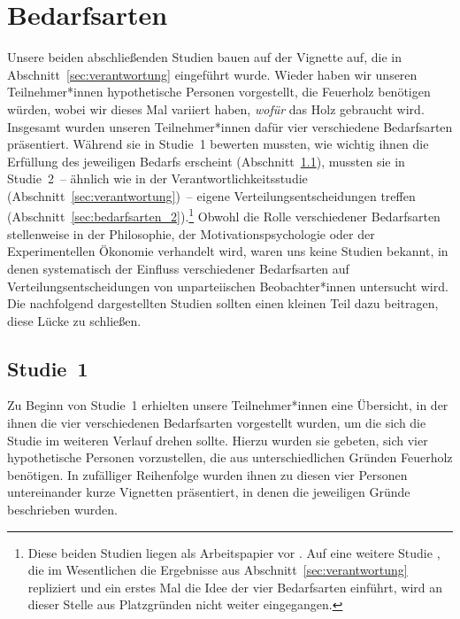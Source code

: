 \documentclass[justified,nobib,symmetric,twoside]{tufte-handout}
\begin{document}
\section{Bedarfsarten}\label{sec:bedarfsarten}
Unsere beiden abschließenden Studien bauen auf der Vignette auf, die in Abschnitt~\ref{sec:verantwortung} eingeführt wurde.
Wieder haben wir unseren Teilnehmer*innen hypothetische Personen vorgestellt, die Feuerholz benötigen würden, wobei wir dieses Mal variiert haben, \textit{wofür} das Holz gebraucht wird.
Insgesamt wurden unseren Teilnehmer*innen dafür vier verschiedene Bedarfsarten präsentiert.
Während sie in Studie~1 bewerten mussten, wie wichtig ihnen die Erfüllung des jeweiligen Bedarfs erscheint (Abschnitt~\ref{sec:bedarfsarten_1}), mussten sie in Studie~2~-- ähnlich wie in der Verantwortlichkeitsstudie (Abschnitt~\ref{sec:verantwortung})~-- eigene Verteilungsentscheidungen treffen (Abschnitt~\ref{sec:bedarfsarten_2}).\footnote[][-3cm]{Diese beiden Studien liegen als Arbeitspapier vor \citep{bauer_kinds_2023}. Auf eine weitere Studie \citep{bauer_deeds_nd}, die im Wesentlichen die Ergebnisse aus Abschnitt~\ref{sec:verantwortung} repliziert und ein erstes Mal die Idee der vier Bedarfsarten einführt, wird an dieser Stelle aus Platzgründen nicht weiter eingegangen.}
Obwohl die Rolle verschiedener Bedarfsarten stellenweise in der Philosophie, der Motivationspsychologie oder der Experimentellen Ökonomie verhandelt wird, waren uns keine Studien bekannt, in denen systematisch der Einfluss verschiedener Bedarfsarten auf Verteilungsentscheidungen von unparteiischen Beobachter*innen untersucht wird.
Die nachfolgend dargestellten Studien sollten einen kleinen Teil dazu beitragen, diese Lücke zu schließen.


\subsection{Studie~1}\label{sec:bedarfsarten_1}
Zu Beginn von Studie~1 erhielten unsere Teilnehmer*innen eine Übersicht, in der ihnen die vier verschiedenen Bedarfsarten vorgestellt wurden, um die sich die Studie im weiteren Verlauf drehen sollte.
Hierzu wurden sie gebeten, sich vier hypothetische Personen vorzustellen, die aus unterschiedlichen Gründen Feuerholz benötigen.
In zufälliger Reihenfolge wurden ihnen zu diesen vier Personen untereinander kurze Vignetten präsentiert, in denen die jeweiligen Gründe beschrieben wurden.
\end{document}
